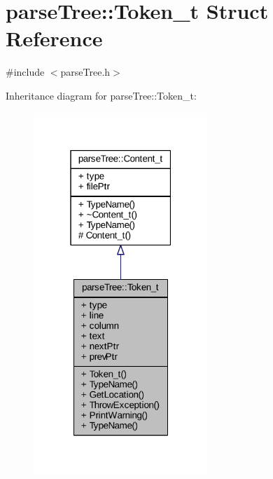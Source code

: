 \hypertarget{structparse_tree_1_1_token__t}{}\section{parse\+Tree\+:\+:Token\+\_\+t Struct Reference}
\label{structparse_tree_1_1_token__t}


{\ttfamily \#include $<$parse\+Tree.\+h$>$}



Inheritance diagram for parse\+Tree\+:\+:Token\+\_\+t\+:
\nopagebreak
\begin{figure}[H]
\begin{center}
\leavevmode
\includegraphics[width=187pt]{structparse_tree_1_1_token__t__inherit__graph}
\end{center}
\end{figure}


